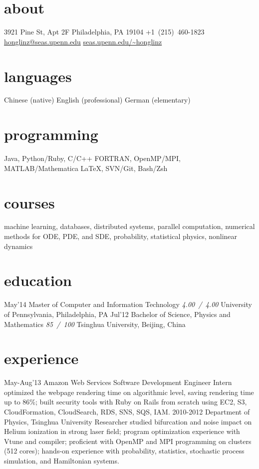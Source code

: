 \documentclass[]{friggeri-cv}
\begin{document}
{}

\begin{aside}
  \section{about}
  3921 Pine St, Apt 2F
  Philadelphia, PA
  19104
  +1~(215)~460-1823
  \href{mailto:honglinz@seas.upenn.edu}{honglinz@seas.upenn.edu}
  \href{http://www.seas.upenn.edu/~honglinz}{seas.upenn.edu/\textasciitilde{}honglinz}
  \section{languages}
  Chinese (native)
  English (professional)
  German (elementary)
  \section{programming}
  Java, Python/Ruby, C/C++
  FORTRAN, OpenMP/MPI, MATLAB/Mathematica
  \LaTeX, SVN/Git, Bash/Zsh
\end{aside}

\section{courses}
machine learning, databases, distributed systems, parallel computation, numerical methods for ODE, PDE, and SDE, probability, statistical physics, nonlinear dynamics
\section{education}

\begin{entrylist}
  \entry
    {May'14}
    {Master of Computer and Information Technology}
    {\emph{4.00~/~4.00}}
    {University of Pennsylvania, Philadelphia, PA}
  \entry
    {Jul'12}
    {Bachelor of Science, Physics and Mathematics}
    {\emph{85~/~100}}
    {Tsinghua University, Beijing, China}
\end{entrylist}
\section{experience}
\begin{entrylist}
  \entry
  {May-Aug'13}
  {Amazon Web Services}
  {Software Development Engineer Intern}
  {optimized the webpage rendering time on algorithmic level, saving rendering time up to 86\%; built security tools with Ruby on Rails from scratch using EC2, S3, CloudFormation, CloudSearch, RDS, SNS, SQS, IAM.}
  \entry
  {2010-2012}
  {Department of Physics, Tsinghua University}
  {Researcher}
  {studied bifurcation and noise impact on Helium ionization in strong laser field; program optimization experience with Vtune and compiler; proficient with OpenMP and MPI programming on clusters (512 cores); hands-on experience with probability, statistics, stochastic process simulation, and Hamiltonian systems.}
\end{entrylist}
\end{document}
